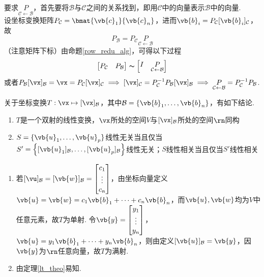 \begin{myalgorithm}[在$\rn$中换基]
要求$\underset{\mathcal{C}\gets \mathcal{B}}{P}$，首先要将$\mathcal{B}$与$\mathcal{C}$之间的关系找到，即用$\mathcal{C}$中的向量表示$\mathcal{B}$中的向量.\\
设坐标变换矩阵$P_\mathcal{C}=\bmat{\vb{c}_1}{\vb{c}_n}$，进而$\vb{b}_i=P_{\mathcal{C}}[\vb{b}_i]_{\mathcal{C}}$，故
\[P_{\mathcal{B}}=P_{\mathcal{C}}\underset{\mathcal{C}\gets \mathcal{B}}{P}\]
（注意矩阵下标）由命题\ref{row_redu_alg}，可得以下过程
\[\begin{bmatrix}P_\mathcal{C}&P_\mathcal{B}\end{bmatrix}\thicksim\begin{bmatrix}I&\underset{\mathcal{C}\gets \mathcal{B}}{P}\end{bmatrix}\]
或者$P_\mathcal{B}[\vx]_\mathcal{B}=\vx=P_\mathcal{C}[\vx]_\mathcal{C}\implies [\vx]_\mathcal{C}=P_\mathcal{C}^{-1}P_\mathcal{B}[\vx]_\mathcal{B}\implies \underset{\mathcal{C}\gets \mathcal{B}}{P}=P_{\mathcal{C}}^{-1}P_{\mathcal{B}}$.
\end{myalgorithm}
\begin{theorem}%
关于坐标变换$T:\vx\mapsto[\vx]_{\mathcal{B}}$，其中$\mathcal{B}=\{\vb{b}_1,\dots,\vb{b}_n\}$，有如下结论.
\begin{enumerate}
	\item $T$是一个双射的线性变换，$\vx$所处的空间$V$与$[\vx]_\mathcal{B}$所处的空间$\rn$同构
	\item $S=\{\vb{u}_1,\dots,\vb{u}_p\}$线性无关当且仅当$S'=\left\{[\vb{u}_1]_\mathcal{B},\dots,[\vb{u}_p]_\mathcal{B}\right\}$线性无关；$S$线性相关当且仅当$S'$线性相关
\end{enumerate}
\end{theorem}
\begin{analysis}
\begin{enumerate}
	\item 若$[\vu]_\mathcal{B}=[\vb{w}]_\mathcal{B}=\begin{bmatrix}c_1\\\vdots\\c_n\end{bmatrix}$，由坐标向量定义$\vb{u}=\vb{w}=c_1\vb{b}_1+\cdots+c_n\vb{b}_n$，而$\vb{u},\vb{w}$均为$V$中任意元素，故$T$为单射. 令$\vb{y}=\begin{bmatrix}y_1\\\vdots\\y_n\end{bmatrix}$，$\vb{u}=y_1\vb{b}_1+\cdots+y_n\vb{b}_n$，则由定义$[\vb{u}]_\mathcal{B}=\vb{y}$，因$\vb{y}$为$\rn$任意向量，故$T$为满射.
	\item 由定理\ref{lt_theo}易知.
\end{enumerate}
\end{analysis}